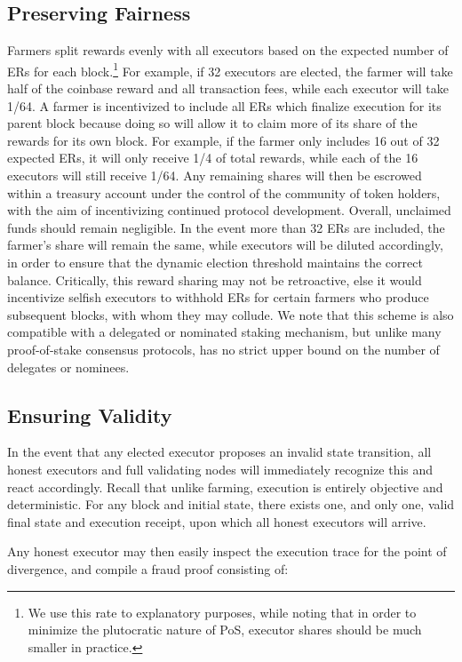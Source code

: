 \documentclass[conference]{IEEEtran}
\begin{document}
\subsection{Preserving Fairness}

Farmers split rewards evenly with all executors based on the expected number of ERs for each block.\footnote{We use this rate to explanatory purposes, while noting that in order to minimize the plutocratic nature of PoS, executor shares should be much smaller in practice.} For example, if 32 executors are elected, the farmer will take half of the coinbase reward and all transaction fees, while each executor will take 1/64. A farmer is incentivized to include all ERs which finalize execution for its parent block because doing so will allow it to claim more of its share of the rewards for its own block. For example, if the farmer only includes 16 out of 32 expected ERs, it will only receive 1/4 of total rewards, while each of the 16 executors will still receive 1/64. Any remaining shares will then be escrowed within a treasury account under the control of the community of token holders, with the aim of incentivizing continued protocol development. Overall, unclaimed funds should remain negligible. In the event more than 32 ERs are included, the farmer’s share will remain the same, while executors will be diluted accordingly, in order to ensure that the dynamic election threshold maintains the correct balance. Critically, this reward sharing may not be retroactive, else it would incentivize selfish executors to withhold ERs for certain farmers who produce subsequent blocks, with whom they may collude. We note that this scheme is also compatible with a delegated or nominated staking mechanism, but unlike many proof-of-stake consensus protocols, has no strict upper bound on the number of delegates or nominees.

\subsection{Ensuring Validity}

In the event that any elected executor proposes an invalid state transition, all honest executors and full validating nodes will immediately recognize this and react accordingly. Recall that unlike farming, execution is entirely objective and deterministic. For any block and initial state, there exists one, and only one, valid final state and execution receipt, upon which all honest executors will arrive. 

Any honest executor may then easily inspect the execution trace for the point of divergence, and compile a fraud proof consisting of:
\end{document}
